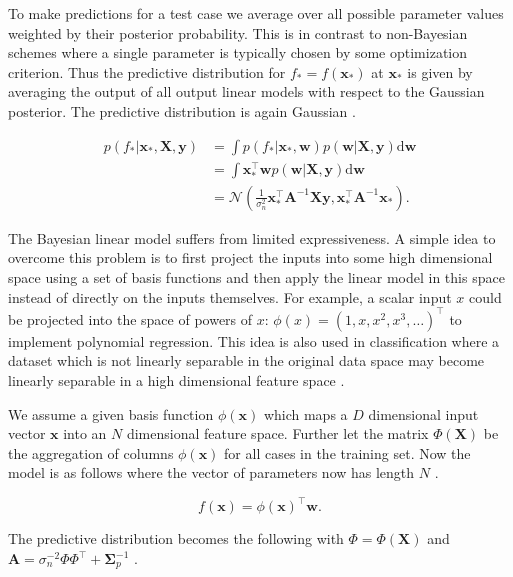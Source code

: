 \documentclass[../../../main.tex]{subfiles}
\begin{document}
To make predictions for a test case we average over all possible parameter values weighted by their posterior probability. This is in contrast to non-Bayesian schemes where a single parameter is typically chosen by some optimization criterion. Thus the predictive distribution for $f_\ast=f(\bm{x}_\ast)$ at $\bm{x}_\ast$ is given by averaging the output of all output linear models with respect to the Gaussian posterior. The predictive distribution is again Gaussian \autocite{Rasmussen2005}.

\begin{equation}
\begin{split}
p(f_\ast|\bm{x}_\ast,\bm{X},\bm{y}) &= \int p(f_\ast|\bm{x}_\ast,\bm{w})p(\bm{w}|\bm{X},\bm{y})\mathrm{d}\bm{w} \\
&= \int \bm{x}_\ast^\top\bm{w}p(\bm{w}|\bm{X},\bm{y})\mathrm{d}\bm{w} \\
&= \mathcal{N}\left(\frac{1}{\sigma_n^2}\bm{x}_\ast^\top\bm{A}^{-1}\bm{X}\bm{y},\bm{x}_\ast^\top\bm{A}^{-1}\bm{x}_\ast\right).
\end{split}
\end{equation}

The Bayesian linear model suffers from limited expressiveness. A simple idea to overcome this problem is to first project the inputs into some high dimensional space using a set of basis functions and then apply the linear model in this space instead of directly on the inputs themselves. For example, a scalar input $x$ could be projected into the space of powers of $x$: $\phi(x)=(1,x,x^2,x^3,\ldots)^\top$ to implement polynomial regression. This idea is also used in classification where a dataset which is not linearly separable in the original data space may become linearly separable in a high dimensional feature space \autocite{Rasmussen2005}.

We assume a given basis function $\phi(\bm{x})$ which maps a $D$ dimensional input vector $\bm{x}$ into an $N$ dimensional feature space. Further let the matrix $\Phi(\bm{X})$ be the aggregation of columns $\phi(\bm{x})$ for all cases in the training set. Now the model is as follows where the vector of parameters now has length $N$ \autocite{Rasmussen2005}.

\begin{equation}
f(\bm{x}) = \phi(\bm{x})^\top\bm{w}.
\end{equation}

The predictive distribution becomes the following with $\Phi=\Phi(\bm{X})$ and $\bm{A}=\sigma_n^{-2}\Phi\Phi^\top+\bm{\Sigma}_p^{-1}$ \autocite{Rasmussen2005}.
\end{document}
